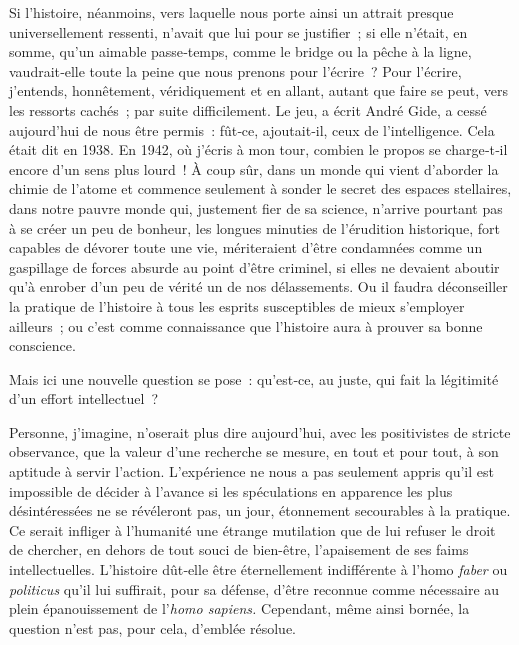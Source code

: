 \documentclass[french,twoside]{book} %
\newcommand{\astermono}{\medskip\centerline{\color{rubric}\large\selectfont{\syms ✻}}\medskip\par}%
\begin{document}
\astermono

\noindent  {}
\label{pXII} Si l’histoire, néanmoins, vers laquelle nous porte ainsi un attrait pres­que universellement ressenti, n’avait que lui pour se justifier ; si elle n’était, en somme, qu’un aimable passe‑temps, comme le bridge ou la pêche à la ligne, vaudrait‑elle toute la peine que nous prenons pour l’écrire ? Pour l’écrire, j’entends, honnêtement, véridiquement et en allant, autant que faire se peut, vers les ressorts cachés ; par suite difficilement. Le jeu, a écrit André Gide, a cessé aujourd’hui de nous être permis : fût‑ce, ajoutait‑il, ceux de l’intelligence. Cela était dit en 1938. En 1942, où j’écris à mon tour, combien le propos se charge‑t‑il encore d’un sens plus lourd ! À coup sûr, dans un monde qui vient d’aborder la chimie de l’atome et commence seulement à sonder le secret des espaces stellaires, dans notre pauvre monde qui, justement fier de sa science, n’arrive pour­tant pas à se créer un peu de bonheur, les longues minuties de l’érudition historique, fort capables de dévorer toute une vie, mériteraient d’être condamnées comme un gaspillage de forces absurde au point d’être cri­minel, si elles ne devaient aboutir qu’à enrober d’un peu de vérité un de nos délassements. Ou il faudra déconseiller la pratique de l’histoire à tous les esprits susceptibles de mieux s’employer ailleurs ; ou c’est comme connaissance que l’histoire aura à prouver sa bonne conscience.\par
Mais ici une nouvelle question se pose : qu’est‑ce, au juste, qui fait la légitimité d’un effort intellectuel ?\par
Personne, j’imagine, n’oserait plus dire aujourd’hui, avec les positi­vistes de stricte observance, que la valeur d’une recherche se mesure, en tout et pour tout, à son aptitude à servir l’action. L’expérience ne nous a pas seulement appris qu’il est impossible de décider à l’avance si les spéculations en apparence les plus désintéressées ne se révéleront pas, un jour, étonnement secourables à la pratique. Ce serait infliger à l’humanité une étrange mutilation que de lui refuser le droit de chercher, en dehors de tout souci de bien-être, l’apaisement de ses faims intellec­tuelles. L’histoire dût‑elle être éternellement indifférente à l’homo \emph{faber} ou \emph{politicus} qu’il lui suffirait, pour sa défense, d’être reconnue comme nécessaire au plein épanouissement de l’\emph{homo sapiens.} Cependant, même ainsi bornée, la question n’est pas, pour cela, d’emblée résolue.\par
\end{document}
